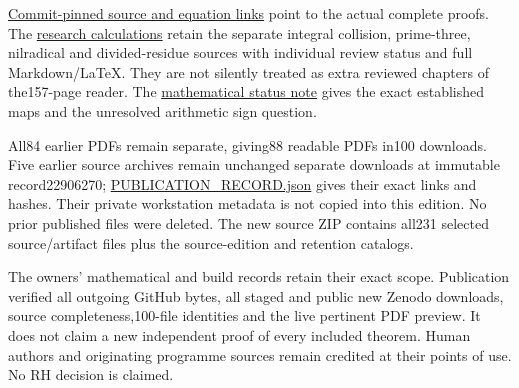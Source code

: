 \documentclass[
]{article}
\begin{document}
\href{PINNED_PROOF_LINKS.json}{Commit-pinned source and equation links}
point to the actual complete proofs. The
\href{https://github.com/KokunoYumeto/zeta-function-research-reader/tree/5a89872598df0902b7c1393cf8e4692ca3010a95/workbenches/splitzero-tandem/branches/tau-zero-prime-positivity/research_calculations}{research
calculations} retain the separate integral collision, prime-three,
nilradical and divided-residue sources with individual review status and
full Markdown/LaTeX. They are not silently treated as extra reviewed
chapters of the157-page reader. The
\href{https://github.com/KokunoYumeto/zeta-function-research-reader/blob/5a89872598df0902b7c1393cf8e4692ca3010a95/workbenches/splitzero-tandem/branches/tau-zero-prime-positivity/RESEARCH_STATUS_ZERO_AND_RESIDUE.md}{mathematical
status note} gives the exact established maps and the unresolved
arithmetic sign question.

All84 earlier PDFs remain separate, giving88 readable PDFs in100
downloads. Five earlier source archives remain unchanged separate
downloads at immutable record22906270; \url{PUBLICATION_RECORD.json}
gives their exact links and hashes. Their private workstation metadata
is not copied into this edition. No prior published files were deleted.
The new source ZIP contains all231 selected source/artifact files plus
the source-edition and retention catalogs.

The owners' mathematical and build records retain their exact scope.
Publication verified all outgoing GitHub bytes, all staged and public
new Zenodo downloads, source completeness,100-file identities and the
live pertinent PDF preview. It does not claim a new independent proof of
every included theorem. Human authors and originating programme sources
remain credited at their points of use. No RH decision is claimed.
\end{document}

